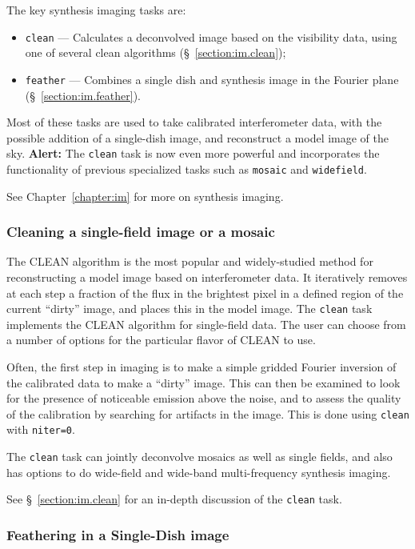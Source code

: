 The key synthesis imaging tasks are:
\begin{itemize}
   \item {\tt clean} --- Calculates a deconvolved image based on the visibility
         data, using one of several clean algorithms  
         (\S~\ref{section:im.clean});
   \item {\tt feather} --- Combines a single dish and synthesis image in the
         Fourier plane (\S~\ref{section:im.feather}).
\end{itemize}
Most of these tasks are used to take calibrated interferometer data, with the
possible addition of a single-dish image, and reconstruct a model
image of the sky. {\bf Alert:} The {\tt clean} task is now even more
powerful and incorporates the functionality of previous specialized
tasks such as {\tt mosaic} and {\tt widefield}.

See Chapter~\ref{chapter:im} for more on synthesis imaging.

\subsubsection{Cleaning a single-field image or a mosaic}
\label{section:intro.walkthru.image.clean}

The CLEAN algorithm is the most popular and widely-studied method for
reconstructing a model image based on interferometer data.  It 
iteratively removes at each step a fraction of the flux
in the brightest pixel in a defined region of the current ``dirty'' 
image, and places this in the model image.  The
{\tt clean} task implements the CLEAN algorithm for single-field
data.  The user can choose from a number of options for the particular 
flavor of CLEAN to use.

Often, the first step in imaging is to make a simple gridded Fourier
inversion of the calibrated data to make a ``dirty'' image.  This
can then be examined to look for the presence of noticeable emission
above the noise, and to assess the quality of the calibration by 
searching for artifacts in the image.  This is done using {\tt clean}
with {\tt niter=0}.

The {\tt clean} task can jointly deconvolve mosaics as well as single
fields, and also has options to do wide-field and wide-band
multi-frequency synthesis imaging.

See \S~\ref{section:im.clean} for an in-depth discussion of the
{\tt clean} task.

\subsubsection{Feathering in a Single-Dish image}
\label{section:intro.walkthru.image.feather}

